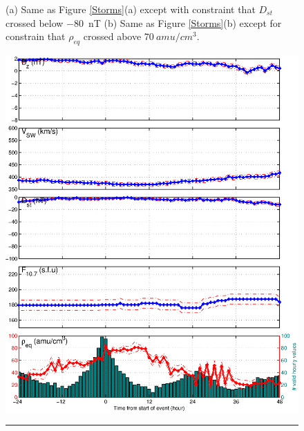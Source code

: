 \documentclass[10pt,twocolumn]{article}
\begin{document}
\begin{figure}[tp!]
\caption{(a) Same as Figure \ref{Storms}(a) except with constraint that $D_{st}$ crossed below $-80$~nT (b) Same as Figure \ref{Storms}(b) except for constrain that $\rho_{eq}$ crossed above $70~amu/cm^3$.}
\label{Dspec}
\end{figure}

\begin{figure}[tp!]
\centering
\includegraphics[scale=0.40]{paperfigures/stormavs-diffden-10amu.eps}
\rule[1ex]{5cm}{1pt}

\end{figure}
\end{document}
